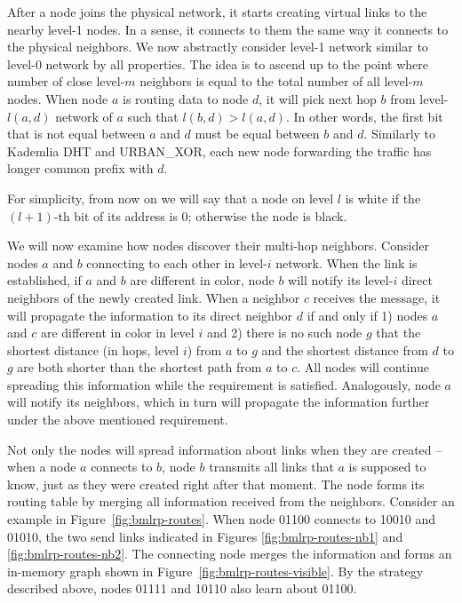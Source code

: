 \documentclass[14pt]{extarticle}
\theoremstyle{definition}
\newcommand{\urbanxor}{URBAN\_XOR}
\begin{document}
After a node joins the physical network, it starts creating virtual links to the nearby level-1 nodes. In a sense, it connects to them the same way it connects to the physical neighbors. We now abstractly consider level-1 network similar to level-0 network by all properties. The idea is to ascend up to the point where number of close level-$m$ neighbors is equal to the total number of all level-$m$ nodes. When node $a$ is routing data to node $d$, it will pick next hop $b$ from level-$l(a,d)$ network of $a$ such that $l(b,d) > l(a,d)$. In other words, the first bit that is not equal between $a$ and $d$ must be equal between $b$ and $d$. Similarly to Kademlia DHT and \urbanxor, each new node forwarding the traffic has longer common prefix with $d$.

For simplicity, from now on we will say that a node on level $l$ is white if the $(l+1)$-th bit of its address is 0; otherwise the node is black.

We will now examine how nodes discover their multi-hop neighbors. Consider nodes $a$ and $b$ connecting to each other in level-$i$ network. When the link is established, if $a$ and $b$ are different in color, node $b$ will notify its level-$i$ direct neighbors of the newly created link. When a neighbor $c$ receives the message, it will propagate the information to its direct neighbor $d$ if and only if 1) nodes $a$ and $c$ are different in color in level $i$ and 2) there is no such node $g$ that the shortest distance (in hops, level $i$) from $a$ to $g$ and the shortest distance from $d$ to $g$ are both shorter than the shortest path from $a$ to $c$. All nodes will continue spreading this information while the requirement is satisfied. Analogously, node $a$ will notify its neighbors, which in turn will propagate the information further under the above mentioned requirement.

Not only the nodes will spread information about links when they are created -- when a node $a$ connects to $b$, node $b$ transmits all links that $a$ is supposed to know, just as they were created right after that moment. The node forms its routing table by merging all information received from the neighbors. Consider an example in Figure~\ref{fig:bmlrp-routes}. When node 01100 connects to 10010 and 01010, the two send links indicated in Figures \ref{fig:bmlrp-routes-nb1} and \ref{fig:bmlrp-routes-nb2}. The connecting node merges the information and forms an in-memory graph shown in Figure~\ref{fig:bmlrp-routes-visible}. By the strategy described above, nodes 01111 and 10110 also learn about 01100.
\end{document}
